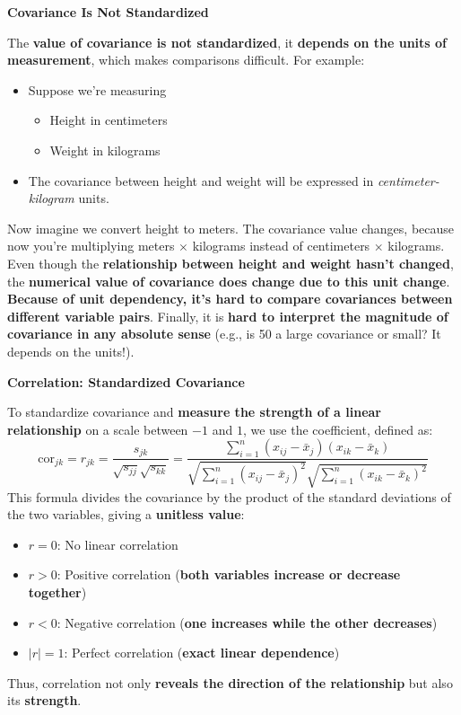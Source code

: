 \highspace
\begin{flushleft}
    \textcolor{Red2}{ \textbf{Covariance Is Not Standardized}}
\end{flushleft}
The \textbf{value of covariance is not standardized}, it \textbf{depends on the units of measurement}, which makes comparisons difficult. For example:
\begin{itemize}
    \item Suppose we're measuring
    \begin{itemize}
        \item Height in centimeters
        \item Weight in kilograms
    \end{itemize}
    \item The covariance between height and weight will be expressed in \emph{centimeter-kilogram} units.
\end{itemize}
Now imagine we convert height to meters. The covariance value changes, because now you're multiplying meters $\times$ kilograms instead of centimeters $\times$ kilograms. Even though the \textbf{relationship between height and weight hasn't changed}, the \textbf{numerical value of covariance does change due to this unit change}. \textbf{Because of unit dependency, it's hard to compare covariances between different variable pairs}. Finally, it is \textbf{hard to interpret the magnitude of covariance in any absolute sense} (e.g., is 50 a large covariance or small? It depends on the units!).

\highspace
\begin{flushleft}
    \textcolor{Green3}{ \textbf{Correlation: Standardized Covariance}}
\end{flushleft}
To standardize covariance and \textbf{measure the strength of a linear relationship} on a scale between $-1$ and $1$, we use the  coefficient, defined as:
\begin{equation}
    \text{cor}_{jk} = r_{jk} = \dfrac{s_{jk}}{\sqrt{s_{jj}}\sqrt{s_{kk}}} = \dfrac{
        \displaystyle\sum_{i=1}^{n}\left(x_{ij} - \bar{x}_{j}\right)\left(x_{ik} - \bar{x}_{k}\right)
    }{
        \sqrt{\displaystyle\sum_{i=1}^{n}\left(x_{ij} - \bar{x}_{j}\right)^{2}} \sqrt{\displaystyle\sum_{i=1}^{n}\left(x_{ik} - \bar{x}_{k}\right)^{2}}
    }
\end{equation}
This formula divides the covariance by the product of the standard deviations of the two variables, giving a \textbf{unitless value}:
\begin{itemize}
    \item $ r = 0 $: No linear correlation
    \item $ r > 0 $: Positive correlation (\textbf{both variables increase or decrease together})
    \item $ r < 0 $: Negative correlation (\textbf{one increases while the other decreases})
    \item $ \left|r\right| = 1 $: Perfect correlation (\textbf{exact linear dependence})
\end{itemize}
Thus, correlation not only \textbf{reveals the direction of the relationship} but also its \textbf{strength}.

